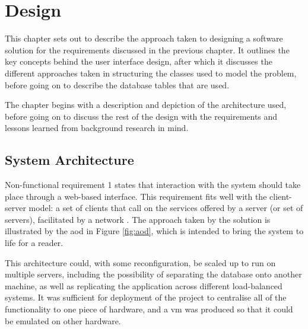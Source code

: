 \chapter{Design}
\label{design}

This chapter sets out to describe the approach taken to designing a software solution for the requirements discussed in the previous chapter.  It outlines the key concepts behind the user interface design, after which it discusses the different approaches taken in structuring the classes used to model the problem, before going on to describe the database tables that are used.

The chapter begins with a description and depiction of the architecture used, before going on to discuss the rest of the design with the requirements and lessons learned from background research in mind. 

\section{System Architecture}
Non-functional requirement 1 states that interaction with the system should take place through a web-based interface.  This requirement fits well with the client-server model: a set of clients that call on the services offered by a server (or set of servers), facilitated by a network \cite{sommerville}.  The approach taken by the solution is illustrated by the \gls{aod} in Figure \ref{fig:aod}, which is intended to bring the system to life for a reader.

This architecture could, with some reconfiguration, be scaled up to run on multiple servers, including the possibility of separating the database onto another machine, as well as replicating the application across different load-balanced systems.  It was sufficient for deployment of the project to centralise all of the functionality to one piece of hardware, and a \gls{vm} was produced so that it could be emulated on other hardware.

